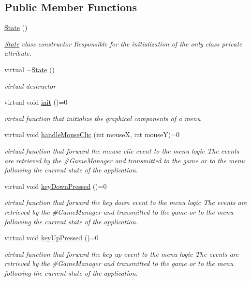 \subsection*{Public Member Functions}
\begin{DoxyCompactItemize}
\item 
\hyperlink{class_symp_1_1_state_ad44d90b6e1b68eb021ceaa0cb98141a4}{State} ()
\begin{DoxyCompactList}\small\item\em \hyperlink{class_symp_1_1_state}{State} class constructor Responsible for the initialization of the only class private attribute. \end{DoxyCompactList}\item 
virtual \hyperlink{class_symp_1_1_state_a52aa946045142cb351fccf6c66648d75}{$\sim$\-State} ()
\begin{DoxyCompactList}\small\item\em virtual destructor \end{DoxyCompactList}\item 
virtual void \hyperlink{class_symp_1_1_state_a2c1c597b1235128a356c7529c42fdec3}{init} ()=0
\begin{DoxyCompactList}\small\item\em virtual function that initialize the graphical components of a menu \end{DoxyCompactList}\item 
virtual void \hyperlink{class_symp_1_1_state_a23e468a10d9be4c79d17e22d1d5ef478}{handle\-Mouse\-Clic} (int mouse\-X, int mouse\-Y)=0
\begin{DoxyCompactList}\small\item\em virtual function that forward the mouse clic event to the menu logic The events are retrieved by the \#\-Game\-Manager and transmitted to the game or to the menu following the current state of the application. \end{DoxyCompactList}\item 
virtual void \hyperlink{class_symp_1_1_state_ac9ff920d185cdc17c9bc3ac63b40c62d}{key\-Down\-Pressed} ()=0
\begin{DoxyCompactList}\small\item\em virtual function that forward the key down event to the menu logic The events are retrieved by the \#\-Game\-Manager and transmitted to the game or to the menu following the current state of the application. \end{DoxyCompactList}\item 
virtual void \hyperlink{class_symp_1_1_state_a67d0fc2a02808bbcfdb06935c3be404f}{key\-Up\-Pressed} ()=0
\begin{DoxyCompactList}\small\item\em virtual function that forward the key up event to the menu logic The events are retrieved by the \#\-Game\-Manager and transmitted to the game or to the menu following the current state of the application. \end{DoxyCompactList}\end{DoxyCompactItemize}



